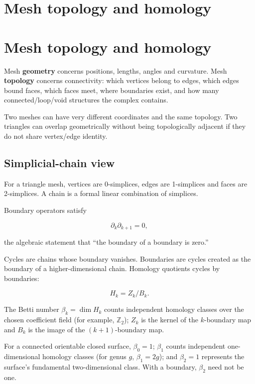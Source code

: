 \hypertarget{appendix-e38976cbbf86}{}
\section*{Mesh topology and homology}
\section{Mesh topology and homology}\label{mesh-topology-and-homology}

Mesh \textbf{geometry} concerns positions, lengths, angles and curvature. Mesh \textbf{topology} concerns connectivity: which vertices belong to edges, which edges bound faces, which faces meet, where boundaries exist, and how many connected/loop/void structures the complex contains.

Two meshes can have very different coordinates and the same topology. Two triangles can overlap geometrically without being topologically adjacent if they do not share vertex/edge identity.

\subsection{Simplicial-chain view}\label{simplicial-chain-view}

For a triangle mesh, vertices are 0-simplices, edges are 1-simplices and faces are 2-simplices. A chain is a formal linear combination of simplices.

Boundary operators satisfy

\[
\partial_k\partial_{k+1}=0,
\]

the algebraic statement that ``the boundary of a boundary is zero.''

Cycles are chains whose boundary vanishes. Boundaries are cycles created as the boundary of a higher-dimensional chain. Homology quotients cycles by boundaries:

\[
H_k=Z_k/B_k.
\]

The Betti number \(\beta_k=\dim H_k\) counts independent homology classes over the chosen coefficient field (for example, \(\mathbb{Z}_2\)); \(Z_k\) is the kernel of the \(k\)-boundary map and \(B_k\) is the image of the \((k+1)\)-boundary map.

For a connected orientable closed surface, \(\beta_0=1\); \(\beta_1\) counts independent one-dimensional homology classes (for genus \(g\), \(\beta_1=2g\)); and \(\beta_2=1\) represents the surface's fundamental two-dimensional class. With a boundary, \(\beta_2\) need not be one.

